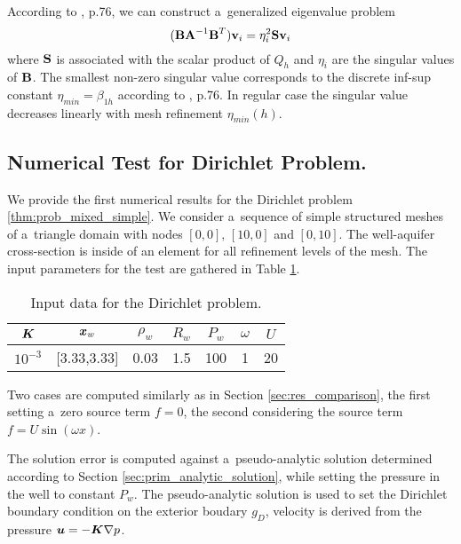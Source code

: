 According to \cite{brezzi_mixed_1991}, p.76, we can construct a~generalized eigenvalue problem
\begin{equation}
    (\textbf{\textrm{B}}\textbf{\textrm{A}}^{-1}\textbf{\textrm{B}}^T) \textbf{\textrm{v}}_i = \eta^2_i \textbf{\textrm{S}} \textbf{\textrm{v}}_i
\end{equation}
where $\textbf{\textrm{S}}$ is associated with the scalar product of $Q_h$ and $\eta_i$ are the singular values of $\textbf{\textrm{B}}$.
The smallest non-zero singular value corresponds to the discrete inf-sup constant $\eta_{min} = \beta_{1h}$
according to \cite{brezzi_mixed_1991}, p.76.
In regular case the singular value decreases linearly with mesh refinement $\eta_{min}(h)$.


\subsection{Numerical Test for Dirichlet Problem.}
We provide the first numerical results for the Dirichlet problem \ref{thm:prob_mixed_simple}.
We consider a~sequence of simple structured meshes of a~triangle domain with nodes $[0,0],\,[10,0]$ and $[0,10]$.
The well-aquifer cross-section is inside of an element for all refinement levels of the mesh.
The input parameters for the test are gathered in Table \ref{tab:test_case_10_data}.
%
\begin{table}[!hb]
\begin{center}
\begin{tabular}{ccccccc}
\toprule
$\mathbf{\boldsymbol{K}}$ & $\mathbf{\boldsymbol{x}}_w$  & $\rho_w$ & $R_w$ & $P_w$ & $\omega$ & $U$ \\
\midrule
$10^{-3}$ & {}[3.33,3.33] & 0.03 & 1.5 & 100 & 1 & 20\\
\bottomrule
\end{tabular}
\caption{Input data for the Dirichlet problem.}
\label{tab:test_case_10_data}
\end{center}
\end{table}
%
Two cases are computed similarly as in Section \ref{sec:res_comparison},
the first setting a~zero source term $f=0$,
the second considering the source term $f=U\sin(\omega x)$.

The solution error is computed against a~pseudo-analytic solution determined according to Section \ref{sec:prim_analytic_solution},
while setting the pressure in the well to constant $P_w$. The pseudo-analytic solution is used to set the Dirichlet boundary condition
on the exterior boudary $g_D$, velocity is derived from the pressure $\mathbf{\boldsymbol{u}}= -\mathbf{\boldsymbol{K}} \nabla p$.

